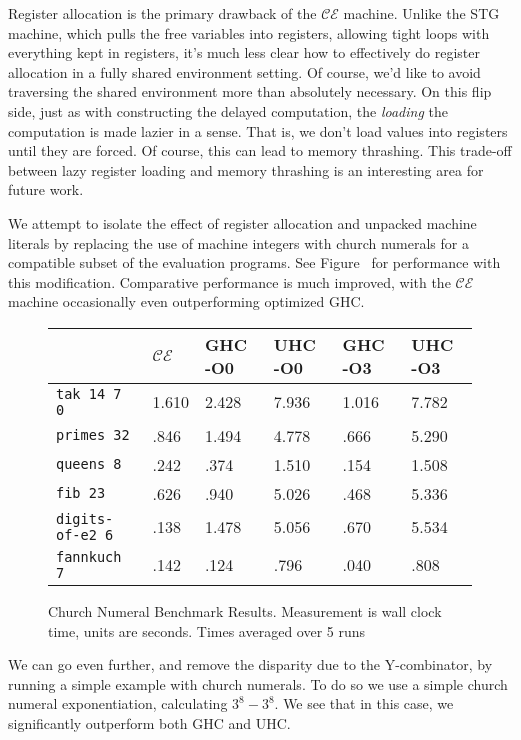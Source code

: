 Register allocation is the primary drawback of the $\mathcal{CE}$ machine.
Unlike the STG machine, which pulls the free variables into registers,
allowing tight loops with everything kept in registers, it's much less clear how
to effectively do register allocation in a fully shared environment setting.
Of course, we'd like to avoid traversing the shared environment more than
absolutely necessary. On this flip side, just as with constructing the delayed
computation, the \emph{loading} the computation is made lazier in a sense. That
is, we don't load values into registers until they are forced. Of course, this
can lead to memory thrashing. This trade-off between lazy register loading and 
memory thrashing is an interesting area for future work.

We attempt to isolate the effect of register allocation and unpacked machine
literals by replacing the use of machine integers with church numerals for a
compatible subset of the evaluation programs. See Figure~\label{fig:res-church}
for performance with this modification. Comparative performance is much
improved, with the $\mathcal{CE}$ machine occasionally even outperforming
optimized GHC.

\begin{figure*}
\centering
\begin{tabularx}{\textwidth}{l | X | X | X | X | X}
& $\mathcal{CE}$ & GHC -O0 & UHC -O0 & GHC -O3 & UHC -O3 \\
\hline
\texttt{tak 14 7 0} & 1.610 & 2.428 & 7.936 & 1.016 & 7.782 \\
\texttt{primes 32} & .846 & 1.494 & 4.778 & .666 & 5.290 \\
\texttt{queens 8} & .242 & .374 & 1.510 & .154 & 1.508 \\
\texttt{fib 23} & .626 & .940 & 5.026 & .468 & 5.336 \\
\texttt{digits-of-e2 6} & .138 & 1.478 & 5.056 & .670 & 5.534 \\
\texttt{fannkuch 7} & .142 & .124 & .796 & .040 & .808 \\
\end{tabularx}
\caption{Church Numeral Benchmark Results. Measurement is wall clock time, 
units are seconds. Times averaged over 5 runs}
\label{fig:res-church}
\end{figure*}

We can go even further, and remove the disparity due to the Y-combinator, by
running a simple example with church numerals. To do so we use a simple church
numeral exponentiation, calculating $3^8 - 3^8$. We see that in this case, we
significantly outperform both GHC and UHC.

